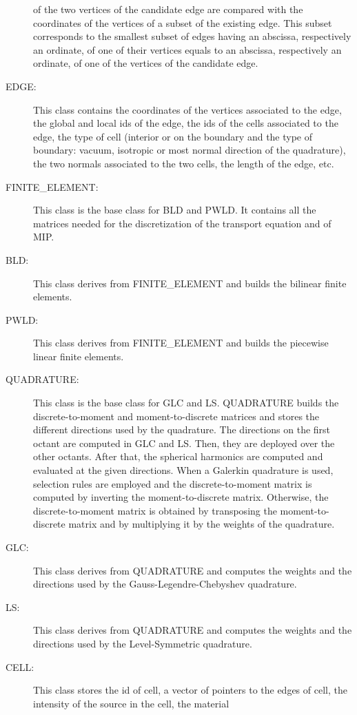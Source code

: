 \begin{description}
    of the two vertices of the candidate edge are compared with the
    coordinates of the vertices of a subset of the existing edge. This subset
    corresponds to the smallest subset of edges having an abscissa,
    respectively an ordinate, of one of their vertices equals to an abscissa,
    respectively an ordinate, of one of the vertices of the candidate edge.
  \item[EDGE:] This class contains the coordinates of the vertices associated
    to the edge, the global and local ids of the edge, the ids of the cells 
    associated to the edge, the type of cell (interior or on the boundary and 
    the type of boundary: vacuum, isotropic or most normal direction of the
    quadrature), the two normals associated to the two cells, the 
    length of the edge, etc.
  \item[FINITE\_ELEMENT:] This class is the base class for BLD and PWLD.
    It contains all the matrices needed for the discretization of the transport
    equation and of MIP.
  \item[BLD:] This class derives from FINITE\_ELEMENT and builds the bilinear
    finite elements.
  \item[PWLD:] This class derives from FINITE\_ELEMENT and builds the
    piecewise linear finite elements.
  \item[QUADRATURE:] This class is the base class for GLC and LS. QUADRATURE
    builds the discrete-to-moment and moment-to-discrete matrices and
    stores the different directions used by the quadrature. The
    directions on the first octant are computed in GLC and LS. Then, they are
    deployed over the other octants. After that, the spherical harmonics
    are computed and evaluated at the given directions. When a Galerkin
    quadrature is used, selection rules are employed and the discrete-to-moment
    matrix is computed by inverting the moment-to-discrete matrix. Otherwise,
    the discrete-to-moment matrix is obtained by transposing the moment-to-discrete
    matrix and by multiplying it by the weights of the quadrature.
  \item[GLC:] This class derives from QUADRATURE and computes the weights and
    the directions used by the Gauss-Legendre-Chebyshev quadrature.
  \item[LS:] This class derives from QUADRATURE and computes the weights and
    the directions used by the Level-Symmetric quadrature.
  \item[CELL:] This class stores the id of cell, a vector of pointers to the
    edges of cell, the intensity of the source in the cell, the material

\end{description}
